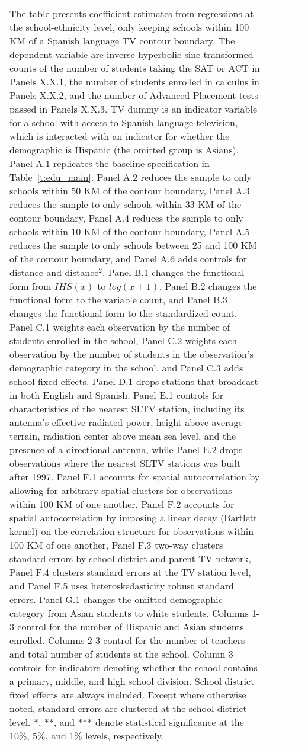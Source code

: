 \begin{center}
\begin{footnotesize}
\begin{longtable}{lccccccc}
			\multicolumn{4}{p{30em}}{The table presents coefficient estimates from regressions at the school-ethnicity level, only keeping schools within 100 KM of a Spanish language TV contour boundary. The dependent variable are inverse hyperbolic sine transformed counts of the number of students taking the SAT or ACT in Panels X.X.1, the number of students enrolled in calculus in Panels X.X.2, and the number of Advanced Placement tests passed in Panels X.X.3. TV dummy is an indicator variable for a school with access to Spanish language television, which is interacted with an indicator for whether the demographic is Hispanic (the omitted group is Asians). Panel A.1 replicates the baseline specification in Table~\ref{t:edu_main}. Panel A.2 reduces the sample to only schools within 50 KM of the contour boundary, Panel A.3 reduces the sample to only schools within 33 KM of the contour boundary, Panel A.4 reduces the sample to only schools within 10 KM of the contour boundary, Panel A.5 reduces the sample to only schools between 25 and 100 KM of the contour boundary, and Panel A.6 adds controls for distance and distance$^2$. Panel B.1 changes the functional form from $IHS(x)$ to $log(x+1)$, Panel B.2 changes the functional form to the variable count, and Panel B.3 changes the functional form to the standardized count. Panel C.1 weights each observation by the number of students enrolled in the school, Panel C.2 weights each observation by the number of students in the observation's demographic category in the school, and Panel C.3 adds school fixed effects. Panel D.1 drops stations that broadcast in both English and Spanish. Panel E.1 controls for characteristics of the nearest SLTV station, including its antenna's effective radiated power, height above average terrain, radiation center above mean sea level, and the presence of a directional antenna, while Panel E.2 drops observations where the nearest SLTV stations was built after 1997. Panel F.1 accounts for spatial autocorrelation by allowing for arbitrary spatial clusters for observations within 100 KM of one another, Panel F.2 accounts for spatial autocorrelation by imposing a linear decay (Bartlett kernel) on the correlation structure for observations within 100 KM of one another, Panel F.3 two-way clusters standard errors by school district and parent TV network, Panel F.4 clusters standard errors at the TV station level, and Panel F.5 uses heteroskedasticity robust standard errors. Panel G.1 changes the omitted demographic category from Asian students to white students. Columns 1-3 control for the number of Hispanic and Asian students enrolled. Columns 2-3 control for the number of teachers and total number of students at the school. Column 3 controls for indicators denoting whether the school contains a primary, middle, and high school division. School district fixed effects are always included. Except where otherwise noted, standard errors are clustered at the school district level. *, **, and *** denote statistical significance at the 10\%, 5\%, and 1\% levels, respectively.}
\end{longtable}
\end{footnotesize}
\end{center}

